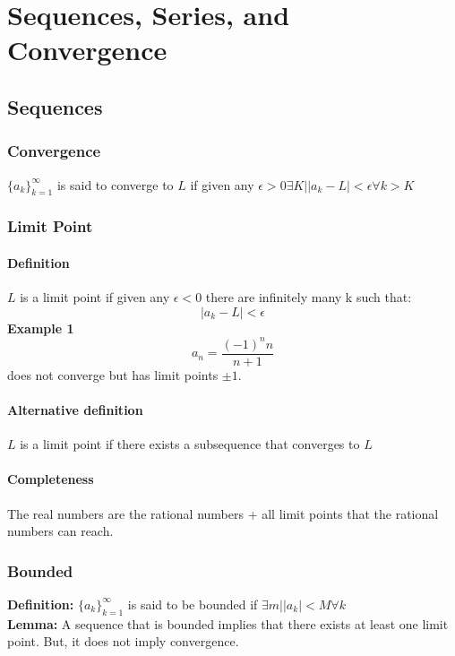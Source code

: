 \documentclass[../main.tex]{subfiles}
\begin{document}
\chapter{Sequences, Series, and Convergence}
\section{Sequences}
    \subsection{Convergence}
        $\{a_{k}\}^{\infty}_{k=1}$ is said to converge to $L$ if given any
        $\epsilon>0\exists K| |a_{k}-L|<\epsilon \forall k > K$ 

    \subsection{Limit Point}
        \subsubsection{Definition}
            $L$ is a limit point if given any $\epsilon<0$ there are infinitely many k such that:
            $$|a_{k}-L|<\epsilon$$
            \textbf{Example 1}
                $$a_{n}=\frac{(-1)^{n}n}{n+1}$$
            does not converge but has limit points $\pm1$.

        \subsubsection{Alternative definition}
            $L$ is a limit point if there exists a subsequence that converges to $L$

        \subsubsection{Completeness}
        The real numbers are the rational numbers + all limit points that the rational numbers can reach.
    
    \subsection{Bounded}
        \textbf{Definition:}
            $\{a_{k}\}^{\infty}_{k=1}$ is said to be bounded if
            $\exists m | |a_{k}|<M \forall k$\\
        
        \noindent\textbf{Lemma:}
        A sequence that is bounded implies that there exists at least one 
        limit point. But, it does not imply convergence.\\
\end{document}
